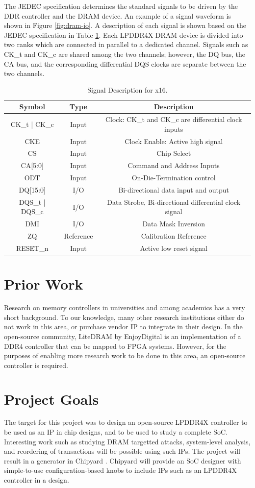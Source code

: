 The JEDEC specification determines the standard signals to be driven by the DDR controller and the DRAM device. An example of a signal waveform is shown in Figure \ref{fig:dram-io}. A description of each signal is shown based on the JEDEC specification in Table \ref{tab:signal-def}. Each LPDDR4X DRAM device is divided into two ranks which are connected in parallel to a dedicated channel. Signals such as CK\_t and CK\_c are shared among the two channels; however, the DQ bus, the CA bus, and the corresponding differential DQS clocks are separate between the two channels. 
\begin{table}[]
    \centering
    \begin{tabular}{c|c|c}
         Symbol & Type &  Description\\
         \hline
         CK\_t | CK\_c & Input & Clock: CK\_t and CK\_c are differential clock inputs\\
         CKE & Input & Clock Enable: Active high signal\\
         CS & Input & Chip Select \\
         CA[5:0] & Input & Command and Address Inputs\\
         ODT & Input & On-Die-Termination control\\
         DQ[15:0] & I/O & Bi-directional data input and output\\
         DQS\_t | DQS\_c & I/O & Data Strobe, Bi-directional differential clock signal\\
         DMI & I/O & Data Mask Inversion \\
         ZQ & Reference & Calibration Reference \\
         RESET\_n & Input & Active low reset signal
    \end{tabular}
    \caption{Signal Description for x16.}
    \label{tab:signal-def}
\end{table}
\newpage
\section{Prior Work}
Research on memory controllers in universities and among academics has a very short background. To our knowledge, many other research institutions either do not work in this area, or purchase vendor IP to integrate in their design. In the open-source community, LiteDRAM by EnjoyDigital \cite{enjoydigital} is an implementation of a DDR4 controller that can be mapped to FPGA systems. However, for the purposes of enabling more research work to be done in this area, an open-source controller is required.
\section{Project Goals}
The target for this project was to design an open-source LPDDR4X controller to be used as an IP in chip designs, and to be used to study a complete SoC. Interesting work such as studying DRAM targetted attacks, system-level analysis, and reordering of transactions will be possible using such IPs. The project will result in a generator in Chipyard \cite{chipyard}. Chipyard will provide an SoC designer with simple-to-use configuration-based knobs to include IPs such as an LPDDR4X controller in a design.